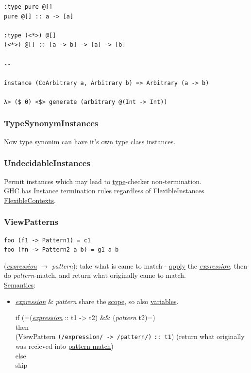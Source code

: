 \documentclass[a4paper,14pt,oneside]{book}
\begin{document}
{\begin{verbatim}
:type pure @[]
pure @[] :: a -> [a]

:type (<*>) @[]
(<*>) @[] :: [a -> b] -> [a] -> [b]

--

instance (CoArbitrary a, Arbitrary b) => Arbitrary (a -> b)

λ> ($ 0) <$> generate (arbitrary @(Int -> Int))
\end{verbatim}

\subsubsection{\label{org74ec05f}TypeSynonymInstances}
\label{sec:orgbf2b0bf}
Now \hyperref[orga9ca243]{type} synonim can have it's own \hyperref[org6c8048d]{type class} instances.\\

\subsubsection{\label{org3cc5865}UndecidableInstances}
\label{sec:org96fa6be}
Permit instances which may lead to \hyperref[orga9ca243]{type}-checker non-termination.\\

GHC has Instance termination rules regardless of \hyperref[org0f11a39]{FlexibleInstances} \hyperref[orgb50b16b]{FlexibleContexts}.\\

\subsubsection{\label{org5efc4e3}ViewPatterns}
\label{sec:orgcf3c9ea}
\begin{verbatim}
foo (f1 -> Pattern1) = c1
foo (fn -> Pattern2 a b) = g1 a b
\end{verbatim}
(\emph{\hyperref[org4f4ad69]{expression}} \(\to\) \emph{pattern}): take what is came to match - \hyperref[orgd9cb618]{apply} the \emph{\hyperref[org4f4ad69]{expression}}, then do \emph{pattern}-match, and return what originally came to match.\\

\hyperref[orgcecfd32]{Semantics}:\\
\begin{itemize}
\item \emph{\hyperref[org4f4ad69]{expression}} \& \emph{pattern} share the \hyperref[orgd4e671a]{scope}, so also \hyperref[org3e16d0c]{variables}.\\
\item[{if (=(\emph{\hyperref[org4f4ad69]{expression}} :: t1 -> t2) \&\& (\emph{pattern}}] t2)=)\\
then\\
  (ViewPattern \texttt{(/expression/ -> /pattern/)} \texttt{:: t1}) (return what originally was recieved into \hyperref[org8c05feb]{pattern match})\\
else\\
  skip\\
\end{itemize}

}
\end{document}
